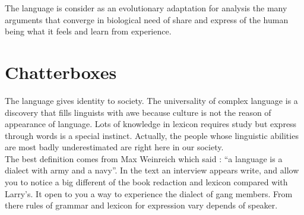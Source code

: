 \documentclass[13pt,letterpaper,onecolumn]{report}
\begin{document}
\hspace{1em}The language is consider as an evolutionary adaptation for analysis the many arguments that converge in biological need of share and express of the human being what it feels and learn from experience.

\pagebreak[4]

\chapter{Chatterboxes}
\hspace{4em} The language gives identity to society. The universality of complex language is a discovery that fills linguists with awe because culture is not the reason of appearance of language. Lots of knowledge in lexicon requires study but express through words is a special instinct. Actually, the people whose linguistic abilities are most badly underestimated are right here in our society.\\

\hspace{1em} The best definition comes from Max Weinreich which said : “a language is a dialect with army and a navy”.  In the text an interview appears write, and allow you to notice a big different of the book redaction and lexicon compared with Larry’s. It open to you a way to experience the dialect of gang members. From there rules of grammar and lexicon for expression vary depends of speaker.\\
\end{document}
